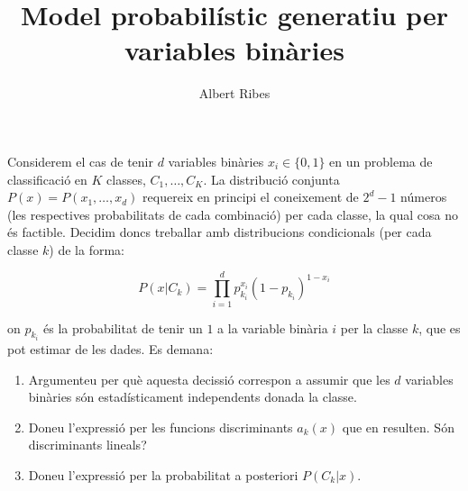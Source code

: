 \documentclass[a4paper]{article}
\author{Albert Ribes}
\title{Model probabilístic generatiu per variables binàries}
\begin{document}
    \maketitle


    Considerem el cas de tenir $d$ variables binàries $x_i \in \{0, 1\}$ en un problema de classificació en $K$ classes,
    $C_1,\dots, C_K$. La distribució conjunta $P(x) = P(x_1,\dots, x_d)$
     requereix en principi el coneixement de
     $2^d -1 $
    números (les respectives probabilitats de cada combinació) per cada classe, la qual cosa no és factible.
    Decidim doncs treballar amb distribucions condicionals (per cada classe $k$) de la forma:

    \begin{equation*}
        P(x|C_k) = \prod_{i = 1}^{d} p_{k_i}^{x_i} (1 - p_{k_i})^{1 - x_i}
    \end{equation*}


    on $p_{k_i}$ és la probabilitat de tenir un $1$ a la variable binària $i$ per la classe $k$, que es pot estimar de les
    dades. Es demana:

    \begin{enumerate}
        \item Argumenteu per què aquesta decissió correspon a assumir que les $d$ variables binàries són estadísticament independents donada la classe.

        {\bfseries



        }


        \item Doneu l'expressió per les funcions discriminants $a_k(x)$ que en resulten. Són discriminants lineals?

        {\bfseries


        }

        \item Doneu l'expressió per la probabilitat a posteriori $P(C_k |x)$.

        {\bfseries


        }

    \end{enumerate}
\end{document}
